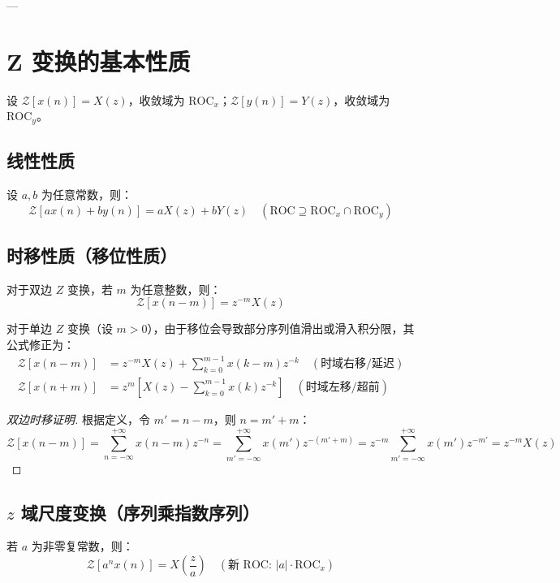 ---

\section{Z 变换的基本性质}

设 $\mathcal{Z}[x(n)] = X(z)$，收敛域为 $\text{ROC}_x$；$\mathcal{Z}[y(n)] = Y(z)$，收敛域为 $\text{ROC}_y$。

\subsection{线性性质}
\begin{tcolorbox}[colback=teal!5!white, colframe=teal!75!black, title=定理 \thechapter.1 \quad 线性性质]
	设 $a, b$ 为任意常数，则：
	$$ \mathcal{Z}[a x(n) + b y(n)] = a X(z) + b Y(z) \quad (\text{ROC} \supseteq \text{ROC}_x \cap \text{ROC}_y) $$
\end{tcolorbox}

\subsection{时移性质（移位性质）}
\begin{tcolorbox}[colback=teal!5!white, colframe=teal!75!black, title=定理 \thechapter.2 \quad 时移性质]
	对于双边 $Z$ 变换，若 $m$ 为任意整数，则：
	$$ \mathcal{Z}[x(n - m)] = z^{-m} X(z) $$
	
	对于单边 $Z$ 变换（设 $m > 0$），由于移位会导致部分序列值滑出或滑入积分限，其公式修正为：
	\begin{align*}
		\mathcal{Z}[x(n - m)] &= z^{-m} X(z) + \sum_{k=0}^{m-1} x(k-m) z^{-k} \quad (\text{时域右移/延迟}) \\
		\mathcal{Z}[x(n + m)] &= z^m \left[ X(z) - \sum_{k=0}^{m-1} x(k) z^{-k} \right] \quad (\text{时域左移/超前})
	\end{align*}
\end{tcolorbox}
\begin{proof}[双边时移证明]
	根据定义，令 $m' = n - m$，则 $n = m' + m$：
	$$ \mathcal{Z}[x(n - m)] = \sum_{n=-\infty}^{+\infty} x(n-m) z^{-n} = \sum_{m'=-\infty}^{+\infty} x(m') z^{-(m'+m)} = z^{-m} \sum_{m'=-\infty}^{+\infty} x(m') z^{-m'} = z^{-m} X(z) $$
\end{proof}

\subsection{$z$ 域尺度变换（序列乘指数序列）}
\begin{tcolorbox}[colback=teal!5!white, colframe=teal!75!black, title=定理 \thechapter.3 \quad $z$ 域尺度变换]
	若 $a$ 为非零复常数，则：
	$$ \mathcal{Z}[a^n x(n)] = X\left(\frac{z}{a}\right) \quad (\text{新 ROC: } |a| \cdot \text{ROC}_x) $$
\end{tcolorbox}

